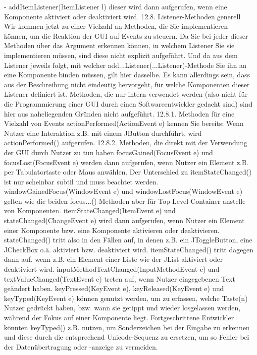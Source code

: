 -	addItemListener(ItemListener l)
dieser wird dann aufgerufen, wenn eine Komponente aktiviert oder deaktiviert wird.
12.8.	Listener-Methoden generell
Wir kommen jetzt zu einer Vielzahl an Methoden, die Sie implementieren können, um die Reaktion der GUI auf Events zu steuern.
Da Sie bei jeder dieser Methoden über das Argument erkennen können, in welchem Listener Sie sie implementieren müssen, sind diese nicht explizit aufgeführt. Und da aus dem Listener jeweils folgt, mit welcher add...Listener(...Listener)-Methode Sie ihn an eine Komponente binden müssen, gilt hier dasselbe. Es kann allerdings sein, dass aus der Beschreibung nicht eindeutig hervorgeht, für welche Komponenten dieser Listener definiert ist.
Methoden, die nur intern verwendet werden (also nicht für die Programmierung einer GUI durch einen Softwareentwickler gedacht sind) sind hier aus naheliegenden Gründen nicht aufgeführt.
12.8.1.	Methoden für eine Vielzahl von Events
actionPerformed(ActionEvent e)
kennen Sie bereits: Wenn Nutzer eine Interaktion z.B. mit einem JButton durchführt, wird actionPerformed() aufgerufen.
12.8.2.	Methoden, die direkt mit der Verwendung der GUI durch Nutzer zu tun haben
focusGained(FocusEvent e) und focusLost(FocusEvent e)
werden dann aufgerufen, wenn Nutzer ein Element z.B. per Tabulatortaste oder Maus anwählen. Der Unterschied zu itemStateChanged() ist nur scheinbar subtil und muss beachtet werden.
windowGainedFocus(WindowEvent e) und windowLostFocus(WindowEvent e)
gelten wie die beiden focus...()-Methoden aber für Top-Level-Container anstelle von Komponenten.
itemStateChanged(ItemEvent e) und stateChanged(ChangeEvent e)
wird dann aufgerufen, wenn Nutzer ein Element einer Komponente bzw. eine Komponente aktivieren oder deaktivieren.
stateChanged() tritt also in den Fällen auf, in denen z.B. ein JToggleButton, eine JCheckBox o.ä. aktiviert bzw. deaktiviert wird. itemStateChanged() tritt dagegen dann auf, wenn z.B. ein Element einer Liste wie der JList aktiviert oder deaktiviert wird.
inputMethodTextChanged(InputMethodEvent e) und textValueChanged(TextEvent e)
treten auf, wenn Nutzer eingegebenen Text geändert haben.
keyPressed(KeyEvent e), keyReleased(KeyEvent e) und keyTyped(KeyEvent e)
können genutzt werden, um zu erfassen, welche Taste(n) Nutzer gedrückt haben, bzw. wann sie getippt und wieder losgelassen werden, während der Fokus auf einer Komponente liegt.
Fortgeschrittene Entwickler könnten keyTyped() z.B. nutzen, um Sonderzeichen bei der Eingabe zu erkennen und diese durch die entsprechend Unicode-Sequenz zu ersetzen, um so Fehler bei der Datenübertragung oder -anzeige zu vermeiden.
